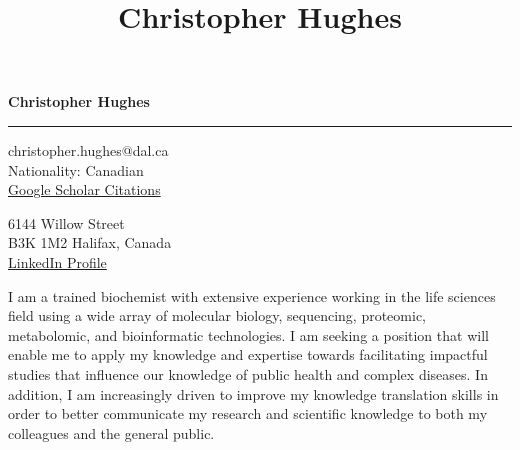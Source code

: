 \documentclass[11pt]{article}
\title{\bfseries\Huge Christopher Hughes}
\author{}
\date{}
\begin{document}
	\newpage
	\setcounter{page}{1}
	\noindent

\begin{LARGE}

	\noindent\textbf{Christopher Hughes}\vspace{1pt}

\end{LARGE}


\noindent\rule{\textwidth}{1pt}\vspace{9pt}

\noindent
\begin{minipage}{0.5\textwidth}
	\begin{flushleft}
		christopher.hughes@dal.ca\\
		Nationality: Canadian\\ \href{https://scholar.google.com/citations?user=jPSwBGwAAAAJ}{Google Scholar Citations}
	\end{flushleft}
\end{minipage}%
\begin{minipage}{0.5\textwidth}
	\begin{flushright}
		6144 Willow Street\\
		B3K 1M2 Halifax, Canada\\ \href{https://www.linkedin.com/in/christopher-hughes-612460133/}{LinkedIn Profile}
	\end{flushright}
\end{minipage}\vspace{18pt}


I am a trained biochemist with extensive experience working in the life sciences field using a wide array of molecular biology, sequencing, proteomic, metabolomic, and bioinformatic technologies. I am seeking a position that will enable me to apply my knowledge and expertise towards facilitating impactful studies that influence our knowledge of public health and complex diseases. In addition, I am increasingly driven to improve my knowledge translation skills in order to better communicate my research and scientific knowledge to both my colleagues and the general public.\\ 
\end{document}
